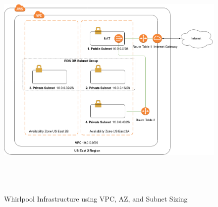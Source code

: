 \pagebreak

\begin{figure}[h!]
  \centering
  \includegraphics[width=18cm,height=12cm,keepaspectratio]{../media/crawler/ten-thousand-feet-aws.png}
  \caption{Whirlpool Infrastructure using VPC, AZ, and Subnet Sizing}
  \label{fig:infra10k}
\end{figure}

